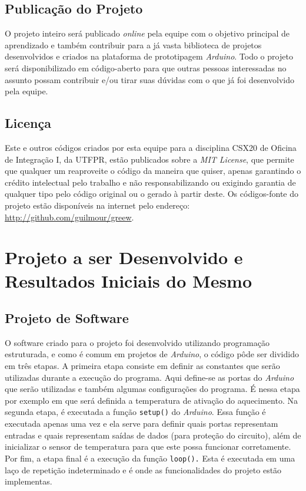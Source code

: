 \documentclass[a4paper,12pt]{article}
\begin{document}
\subsection{Publicação do Projeto}

O projeto inteiro será publicado \textit{online} pela equipe com o objetivo principal de aprendizado e também contribuir para a já vasta biblioteca de projetos desenvolvidos e criados na plataforma de prototipagem \textit{Arduino}. Todo o projeto será disponibilizado em código-aberto para que outras pessoas interessadas no assunto possam contribuir e/ou tirar suas dúvidas com o que já foi desenvolvido pela equipe.

\subsection{Licença}

Este e outros códigos criados por esta equipe para a disciplina CSX20 de Oficina de Integração I, da UTFPR, estão publicados sobre a \textit{MIT License}, que permite que qualquer um reaproveite o código da maneira que quiser, apenas garantindo o crédito intelectual pelo trabalho e não responsabilizando ou exigindo garantia de qualquer tipo pelo código original ou o gerado à partir deste. Os códigos-fonte do projeto estão disponíveis na internet pelo endereço: \href{http://github.com/guilmour/greew}{http://github.com/guilmour/greew}.




\section{Projeto a ser Desenvolvido e Resultados Iniciais do Mesmo}

\subsection{Projeto de Software}

O software criado  para o projeto foi desenvolvido utilizando programação estruturada, e como é comum em projetos de \textit{Arduino}, o código pôde ser dividido em três etapas. A primeira etapa consiste em definir as constantes que serão utilizadas durante a execução do programa. Aqui define-se as portas do \textit{Arduino} que serão utilizadas e também algumas configurações do programa. É nessa etapa por exemplo em que será definida a temperatura de ativação do aquecimento. Na segunda etapa, é executada a função \texttt{setup()} do \textit{Arduino}. Essa função é executada apenas uma vez e ela serve para definir quais portas representam entradas e quais representam saídas de dados (para proteção do circuito), além de inicializar o sensor de temperatura para que este possa funcionar corretamente. Por fim, a etapa final é a execução da função \texttt{loop().} Esta é executada em uma laço de repetição indeterminado e é onde as funcionalidades do projeto estão implementas.
\end{document}
